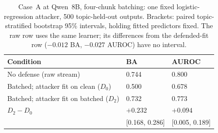 \begin{table}[t]\centering\footnotesize
\caption{Case~A at Qwen~8B, four-chunk batching: one fixed logistic-regression attacker, 500 topic-held-out outputs. Brackets: paired topic-stratified bootstrap 95\% intervals, holding fitted predictors fixed. The raw row uses the same learner; its differences from the defended-fit row ($-0.012$ BA, $-0.027$ AUROC) have no interval.}\label{tab:case-a}
\begin{tabular}{@{}lll@{}}\toprule
Condition & BA & AUROC\\\midrule
No defense (raw stream) & 0.744 & 0.800\\
Batched; attacker fit on clean ($D_0$) & 0.500 & 0.678\\
Batched; attacker fit on batched ($D_2$) & 0.732 & 0.773\\\midrule
$D_2-D_0$ & $+0.232$ & $+0.094$\\
 & {[0.168, 0.286]} & {[0.005, 0.189]}\\
\bottomrule\end{tabular}\end{table}
